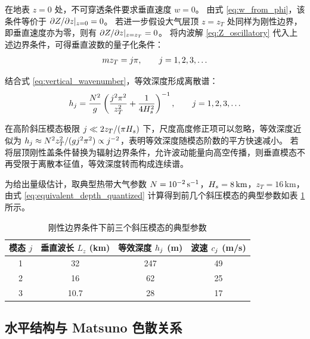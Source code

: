 在地表 $z=0$ 处，不可穿透条件要求垂直速度 $w=0$。
由式 \eqref{eq:w_from_phi}，该条件等价于 $\partial Z/\partial z|_{z=0} = 0$。
若进一步假设大气层顶 $z=z_T$ 处同样为刚性边界，即垂直速度亦为零，则有 $\partial Z/\partial z|_{z=z_T} = 0$。
将内波解 \eqref{eq:Z_oscillatory} 代入上述边界条件，可得垂直波数的量子化条件：
\begin{equation}
    m z_T = j\pi, \qquad j = 1,2,3,\ldots
    \label{eq:quantization}
\end{equation}

结合式 \eqref{eq:vertical_wavenumber}，等效深度形成离散谱：
\begin{equation}
    h_j = \frac{N^2}{g}
    \left( \frac{j^2\pi^2}{z_T^2} + \frac{1}{4H_s^2} \right)^{-1},
    \qquad j = 1,2,3,\ldots
    \label{eq:equivalent_depth_quantized}
\end{equation}

在高阶斜压模态极限 $j \ll 2z_T/(\pi H_s)$ 下，尺度高度修正项可以忽略，等效深度近似为 $h_j \approx N^2 z_T^2/(g j^2\pi^2) \propto j^{-2}$，表明等效深度随模态阶数的平方快速减小。
若将层顶刚性盖条件替换为辐射边界条件，允许波动能量向高空传播，则垂直模态不再受限于离散本征值，等效深度转而构成连续谱。

为给出量级估计，取典型热带大气参数 $N = 10^{-2}\,\mathrm{s^{-1}}$，$H_s = 8\,\mathrm{km}$，$z_T = 16\,\mathrm{km}$，由式 \eqref{eq:equivalent_depth_quantized} 计算得到前几个斜压模态的典型参数如表 \ref{tab:baroclinic_modes} 所示。

\begin{table}[htbp]
    \centering
    \caption{刚性边界条件下前三个斜压模态的典型参数}
    \label{tab:baroclinic_modes}
    \begin{tabular}{cccc}
    \toprule
    模态 $j$ & 垂直波长 $L_z$ (km) & 等效深度 $h_j$ (m) & 波速 $c_j$ (m/s) \\
    \midrule
    1 & 32 & 247 & 49 \\
    2 & 16 & 62 & 25 \\
    3 & 10.7 & 28 & 17 \\
    \bottomrule
    \end{tabular}
\end{table}

\subsection{水平结构与 Matsuno 色散关系}
\label{subsec:matsuno_dispersion}

